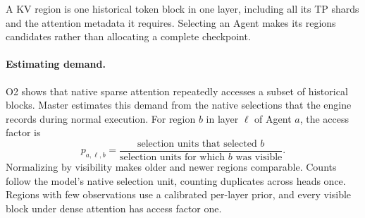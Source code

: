 A KV region is one historical token block in one layer, including all its
TP shards and the attention metadata it requires. Selecting an Agent
makes its regions candidates rather than allocating a complete
checkpoint.

\paragraph{Estimating demand.}
O2 shows that native sparse attention repeatedly accesses a subset of
historical blocks. Master estimates this demand from the native
selections that the engine records during normal execution. For region
$b$ in layer $\ell$ of Agent $a$, the access factor is
\begin{equation}
 p_{a,\ell,b}=
 \frac{\text{selection units that selected }b}
      {\text{selection units for which }b\text{ was visible}}.
 \label{eq:demand}
\end{equation}
Normalizing by visibility makes older and newer regions comparable.
Counts follow the model's native selection unit, counting duplicates
across heads once. Regions with few observations use a calibrated
per-layer prior, and every visible block under dense attention has
access factor one.


